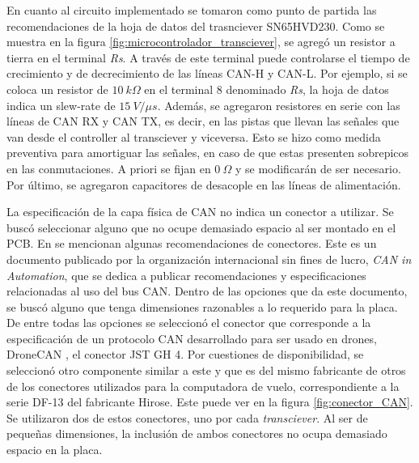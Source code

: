 En cuanto al circuito implementado se tomaron como punto de partida las recomendaciones de la hoja de datos del trasnciever SN65HVD230. Como se muestra en la figura \ref{fig:microcontrolador_transciever}, se agregó un resistor a tierra en el terminal \textit{Rs}. A través de este terminal puede controlarse el tiempo de crecimiento y de decrecimiento de las líneas CAN-H y CAN-L. Por ejemplo, si se coloca un resistor de $10 \ k\Omega$ en el terminal 8 denominado \textit{Rs}, la hoja de datos indica un slew-rate de $15 \ V / \mu s$. Además, se agregaron resistores en serie con las líneas de CAN RX y CAN TX, es decir, en las pistas que llevan las señales que van desde el controller al transciever y viceversa. Esto se hizo como medida preventiva para amortiguar las señales, en caso de que estas presenten sobrepicos en las conmutaciones. A priori se fijan en $0 \ \Omega$ y se modificarán de ser necesario. Por último, se agregaron capacitores de desacople en las líneas de alimentación.



La especificación de la capa física de CAN no indica un conector a utilizar. Se buscó seleccionar alguno que no ocupe demasiado espacio al ser montado en el PCB. En \cite{CiAconnector} se mencionan algunas recomendaciones de conectores. Este es un documento publicado por la organización internacional sin fines de lucro, \textit{CAN in Automation}, que se dedica a publicar recomendaciones y especificaciones relacionadas al uso del bus CAN. Dentro de las opciones que da este documento, se buscó alguno que tenga dimensiones razonables a lo requerido para la placa. De entre todas las opciones se seleccionó el conector que corresponde a la especificación de un protocolo CAN desarrollado para ser usado en drones, DroneCAN \cite{DroneCAN}, el conector JST GH 4. Por cuestiones de disponibilidad, se seleccionó otro componente similar a este y que es del mismo fabricante de otros de los conectores utilizados para la computadora de vuelo, correspondiente a la serie DF-13 del fabricante Hirose. Este puede ver en la figura \ref{fig:conector_CAN}. Se utilizaron dos de estos conectores, uno por cada \textit{transciever}. Al ser de pequeñas dimensiones, la inclusión de ambos conectores no ocupa demasiado espacio en la placa.

